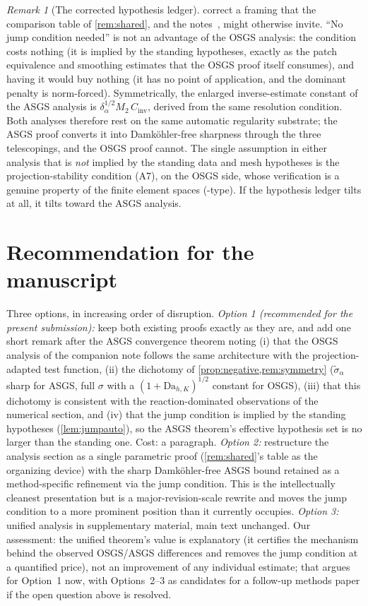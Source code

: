 \documentclass[11pt]{article}
\theoremstyle{remark}
\newtheorem{remark}[theorem]{Remark}
\newcommand{\Dah}{\mathrm{Da}_{h,K}}
\newcommand{\st}{\widetilde{\sigma}_\alpha}
\begin{document}
\begin{remark}[The corrected hypothesis ledger]
\label{rem:ledger}
 correct a framing that the comparison
table of \cref{rem:shared}, and the notes~\cite{OSGSnote}, might otherwise invite.
``No jump condition needed'' is not an advantage of the OSGS analysis: the condition
costs nothing (it is implied by the standing hypotheses, exactly as the patch
equivalence and smoothing estimates that the OSGS proof itself consumes), and having
it would buy nothing (it has no point of application, and the dominant penalty is
norm-forced). Symmetrically, the enlarged inverse-estimate constant of the ASGS
analysis is $\delta_\alpha^{1/2} M_2\, C_{\mathrm{inv}}$, derived from the same
resolution condition. Both analyses therefore rest on the same automatic regularity
substrate; the ASGS proof converts it into Damk\"ohler-free sharpness through the
three telescopings, and the OSGS proof cannot. The single assumption in either
analysis that is \emph{not} implied by the standing data and mesh hypotheses is the
projection-stability condition (A7), on the OSGS side, whose verification is a
genuine property of the finite element spaces
(\cite{CodinaBlasco1997}-type). If the hypothesis ledger tilts at all, it tilts
toward the ASGS analysis.
\end{remark}

\section{Recommendation for the manuscript}
\label{sec:recommendation}

Three options, in increasing order of disruption. \emph{Option 1 (recommended for
the present submission):} keep both existing proofs exactly as they are, and add one
short remark after the ASGS convergence theorem noting (i) that the OSGS analysis
of the companion note follows the same architecture with the projection-adapted
test function, (ii) the dichotomy of \cref{prop:negative,rem:symmetry}
($\st$ sharp for ASGS, full $\sigma$ with a $(1+\Dah)^{1/2}$ constant for OSGS),
(iii) that this dichotomy is consistent with the reaction-dominated
observations of the numerical section, and (iv) that the jump condition is implied
by the standing hypotheses (\cref{lem:jumpauto}), so the ASGS theorem's effective
hypothesis set is no larger than the standing one. Cost: a paragraph. \emph{Option 2:}
restructure the analysis section as a single parametric proof
(\cref{rem:shared}'s table as the organizing device) with the sharp
Damk\"ohler-free ASGS bound retained as a method-specific refinement via the jump
condition. This is the intellectually cleanest presentation but is a
major-revision-scale rewrite and moves the jump condition to a more prominent
position than it currently occupies. \emph{Option 3:} unified analysis in
supplementary material, main text unchanged. Our assessment: the unified theorem's
value is explanatory (it certifies the mechanism behind the observed OSGS/ASGS
differences and removes the jump condition at a quantified price), not an
improvement of any individual estimate; that argues for Option~1 now, with
Options~2--3 as candidates for a follow-up methods paper if the open question above
is resolved.
\end{document}
